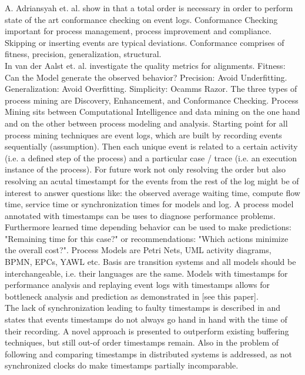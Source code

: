 \documentclass[
	a4paper,
	pagesize,
	pdftex,
	12pt,
	ngerman,
	fleqn,
	final,
	]{scrartcl}
\theoremstyle{plain}
\theoremstyle{definition}
\begin{document}
	A. Adriansyah et. al. show in \cite{adriansyah2011conformance} that a total order is necessary in order to perform state of the art conformance checking on event logs. Conformance Checking important for process management, process improvement and compliance. Skipping or inserting events are typical deviations. Conformance comprises of fitness, precision, generalization, structural. \\
	In \cite{van2012replaying} van der Aalst et. al. investigate the quality metrics for alignments. Fitness: Can the Model generate the observed behavior? Precision: Avoid Underfitting. Generalization: Avoid Overfitting. Simplicity: Ocamms Razor. The three types of process mining are Discovery, Enhancement, and Conformance Checking. Process Mining sits between Computational Intelligence and data mining on the one hand and on the other between process modeling and analysis. Starting point for all process mining techniques are event logs, which are built by recording events sequentially (assumption). Then each unique event is related to  a certain activity (i.e. a defined step of the process) and a particular case / trace (i.e. an execution instance of the process). For future work not only resolving the order but also resolving an acutal timestampt for the events from the rest of the log might be of interest to answer questions like: the observed average waiting time, compute flow time, service time or synchronization times for models and log. A process model annotated with timestamps can be uses to diagnose performance problems. Furthermore learned time depending behavior can be used to make predictions: "Remaining time for this case?" or recommendations: "Which actions minimize the overall cost?". Process Models are Petri Nets, UML activity diagrams, BPMN, EPCs, YAWL etc.
	Basis are transition systems and all models should be interchangeable, i.e. their languages are the same.
	Models with timestamps for performance analysis and replaying event logs with timestamps allows for bottleneck analysis and prediction as demonstrated in [see this paper]. \\
	The lack of synchronization leading to faulty timestamps is described in \cite{mutschler2013reliable} and states that events timestamps do not always go hand in hand with the time of their recording. A novel approach is presented to outperform existing buffering techniques, but still out-of order timestamps remain. Also in \cite{koskinen2008borderpatrol} the problem of following and comparing timestamps in distributed systems is addressed, as not synchronized clocks do make timestamps partially incomparable.  \\
\end{document}
